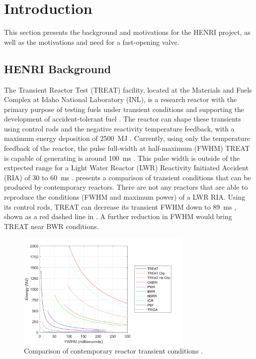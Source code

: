\section{Introduction} \label{s:intro}
This section presents the background and motivations for the HENRI project, as well as the motivations and need for a fast-opening valve.

\subsection{HENRI Background} \label{ss:henri background}
The Transient Reactor Test (TREAT) facility, located at the Materials and Fuels Complex at Idaho National Laboratory (INL), is a research reactor with the primary purpose of testing fuels under transient conditions and supporting the development of accident-tolerant fuel \cite{CINBIZ2017}. The reactor can shape these transients using control rods and the negative reactivity temperature feedback, with a maximum energy deposition of \SI{2500}{\mega\joule} \cite{Holschuh2019}. Currently, using only the temperature feedback of the reactor, the pulse full-width at half-maximum (FWHM) TREAT is capable of generating is around \SI{100}{\milli\second} \cite{Holschuh2019}. This pulse width is outside of the extpected range for a Light Water Reactor (LWR) Reactivity Initiated Accident (RIA) of 30 to \SI{60}{\milli\second} \cite{NEA2010}.  presents a comparison of transient conditions that can be produced by contemporary reactors. There are not any reactors that are able to reproduce the conditions (FWHM and maximum power) of a LWR RIA. Using its control rods, TREAT can decrease its transient FWHM down to \SI{89}{\milli\second} \cite{NEA2010}, shown as a red dashed line in . A further reduction in FWHM would bring TREAT near BWR conditions.



\begin{figure}[htbp]
    \vspace{16pt}
    \centering
    \includegraphics[width=0.75\textwidth]{intro/plots/ReactorTransientComp_Kevin.png}
    \caption{Comparison of contemporary reactor transient conditions \cite{BESS2019}.}
    \label{fig:trans comp}
    \vspace{16pt}
\end{figure}


